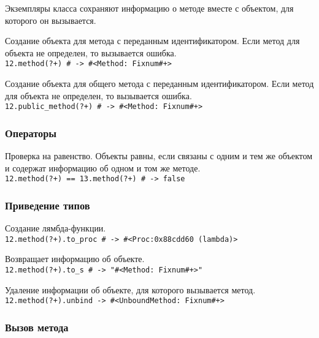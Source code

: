 Экземпляры класса сохраняют информацию о методе вместе с объектом, для которого он вызывается.

\begin{methodlist}
  Создание объекта для метода с переданным идентификатором. Если метод для объекта не определен, то вызывается ошибка.
  \\\verb!12.method(?+) # -> #<Method: Fixnum#+>!

  Создание объекта для общего метода с переданным идентификатором. Если метод для объекта не определен, то вызывается ошибка. 
  \\\verb!12.public_method(?+) # -> #<Method: Fixnum#+>!
\end{methodlist}

\subsubsection*{Операторы}

\begin{methodlist}
  Проверка на равенство. Объекты равны, если связаны с одним и тем же объектом и содержат информацию об одном и том же методе.
  \\\verb!12.method(?+) == 13.method(?+) # -> false!
\end{methodlist}

\subsubsection*{Приведение типов}

\begin{methodlist}
  Создание лямбда-функции.
  \\\verb!12.method(?+).to_proc # -> #<Proc:0x88cdd60 (lambda)>!

  Возвращает информацию об объекте.
  \\\verb!12.method(?+).to_s # -> "#<Method: Fixnum#+>"!

  Удаление информации об объекте, для которого вызывается метод.
  \\\verb!12.method(?+).unbind -> #<UnboundMethod: Fixnum#+>!
\end{methodlist}

\subsubsection*{Вызов метода}

